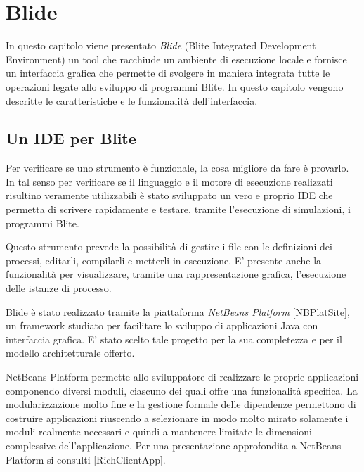 \chapter{Blide}

\textsf{
In questo capitolo viene presentato \emph{Blide} (Blite Integrated Development
Environment) un tool che racchiude un ambiente di esecuzione locale e
fornisce un interfaccia grafica che permette di svolgere in maniera integrata
tutte le operazioni legate allo sviluppo di programmi Blite. 
In questo capitolo vengono descritte le caratteristiche e le funzionalità
dell'interfaccia.
}

\section{Un IDE per Blite}

Per verificare se uno strumento è funzionale, la cosa migliore da fare
è provarlo. In tal senso per verificare se il linguaggio e il motore di
esecuzione realizzati risultino veramente utilizzabili è stato sviluppato un
vero e proprio IDE che permetta di scrivere rapidamente e testare, tramite
l'esecuzione di simulazioni, i programmi Blite.

Questo strumento prevede la possibilità di
gestire i file con le definizioni dei processi, editarli, compilarli e metterli
in esecuzione. E' presente anche la funzionalità per visualizzare, tramite una
rappresentazione grafica, l'esecuzione delle istanze di processo.

Blide è stato realizzato tramite la piattaforma \emph{NetBeans Platform}
[NBPlatSite], un framework studiato per facilitare lo sviluppo di applicazioni
Java con interfaccia grafica. E' stato scelto tale progetto per la sua
completezza e per il modello architetturale offerto. 

NetBeans Platform permette allo sviluppatore di realizzare le proprie
applicazioni componendo diversi moduli, ciascuno dei quali offre una
funzionalità specifica. La modularizzazione molto fine e la gestione
formale delle dipendenze permettono di costruire applicazioni riuscendo a
selezionare in modo molto mirato solamente i moduli realmente necessari e
quindi a mantenere limitate le dimensioni complessive dell'applicazione. 
Per una presentazione approfondita a NetBeans Platform si consulti
[RichClientApp].

